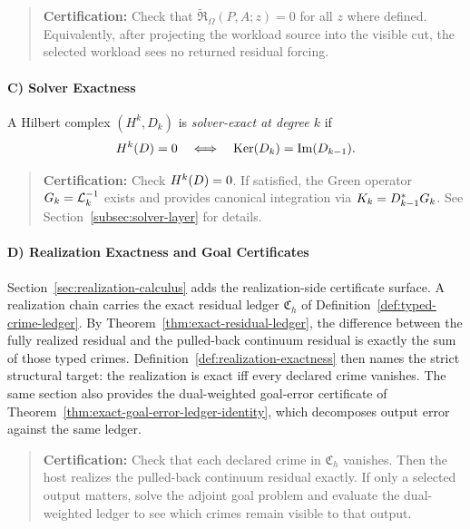 \begin{quote}\small
\textbf{Certification:} Check that
\(\widetilde{\mathfrak R}_{\Omega}(P,A;z)=0\) for all \(z\) where defined.
Equivalently, after projecting the workload source into the visible cut, the
selected workload sees no returned residual forcing.
\end{quote}

\paragraph{C) Solver Exactness}

\begin{definition}
\label{def:solver-exactness}
A Hilbert complex $(H^k, D_k)$ is \emph{solver-exact at degree $k$} if
\[
H^{k}(D) = 0 \quad \Longleftrightarrow \quad \mathrm{Ker}(D_k) = \mathrm{Im}(D_{k-1}).
\]
\end{definition}

\begin{quote}\small
\textbf{Certification:} Check $H^{k}(D) = 0$.
If satisfied, the Green operator $G_{k} = \mathcal{L}_{k}^{-1}$ exists and provides canonical integration via $K_{k} = D_{k-1}^* G_{k}$.
See Section~\ref{subsec:solver-layer} for details.
\end{quote}

\paragraph{D) Realization Exactness and Goal Certificates}

Section~\ref{sec:realization-calculus} adds the realization-side certificate
surface. A realization chain carries the exact residual ledger
\(\mathfrak C_h\) of
Definition~\ref{def:typed-crime-ledger}. By
Theorem~\ref{thm:exact-residual-ledger}, the difference between the fully
realized residual and the pulled-back continuum residual is exactly the sum of
those typed crimes. Definition~\ref{def:realization-exactness} then names the
strict structural target: the realization is exact iff every declared crime
vanishes. The same section also provides the dual-weighted
goal-error certificate of Theorem~\ref{thm:exact-goal-error-ledger-identity},
which decomposes output error against the same ledger.

\begin{quote}\small
\textbf{Certification:} Check that each declared crime in \(\mathfrak C_h\)
vanishes. Then the host realizes the pulled-back continuum residual exactly.
If only a selected output matters, solve the adjoint goal problem and evaluate
the dual-weighted ledger to see which crimes remain visible to that output.
\end{quote}

